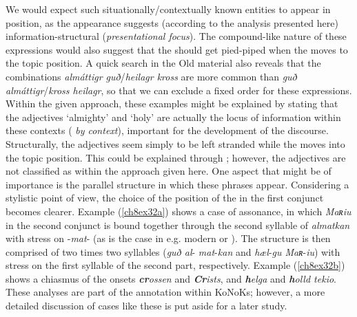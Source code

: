 \documentclass[output=paper,colorlinks,citecolor=brown]{langscibook}
\begin{document}
We would expect such situationally/contextually known entities to appear in  position, as the  appearance suggests (according
to the analysis presented here) information-structural 
(\emph{presentational focus}). The compound-like nature of these
expressions would also suggest that the  should get pied-piped
when the  moves to the topic position. A quick search in the Old
  material also reveals that the combinations \textit{almáttigr
guð}/\textit{heilagr kross} are more common than \textit{guð almáttigr}/\textit{kross heilagr}, so that we can exclude a fixed  order for these
expressions. Within the given approach, these examples might be
explained by stating that the adjectives `almighty' and `holy' are
actually the locus of information within these contexts
(\emph{ by context}), important for the development of the
discourse. Structurally, the adjectives seem simply to be left stranded while
the  moves into the topic position. This could be explained through
; however, the adjectives are not classified as  within
the approach given here. One aspect that might be of importance is the
parallel structure in which these phrases appear. Considering a
stylistic point of view, the choice of the  position of the
 in the first conjunct becomes clearer. Example (\ref{ch8ex32a}) shows a
case of assonance, in which \emph{Maʀiu} in the second conjunct is bound
together through the second syllable of \emph{almatkan} with stress on
-\emph{mat}- (as is the case in e.g. modern  or
). The structure is then comprised of two times two syllables
(\emph{guð al}- \emph{\textbar{} mat}-\emph{kan} and
\emph{hæl}-\emph{gu \textbar{} Maʀ}-\emph{iu}) with stress on the
first syllable of the second part, respectively. Example (\ref{ch8ex32b}) shows a
chiasmus of the onsets \textit{\textbf{cr}ossen} and \textit{\textbf{Cr}ists}, and \textit{\textbf{h}elga} and \textit{\textbf{h}olld tekio}. These analyses are part of the
annotation within KoNoKs; however, a more detailed discussion of cases
like these is put aside for a later study.
\end{document}
